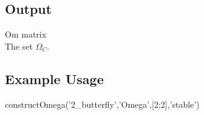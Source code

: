 \subsection*{Output}
\begin{param}
    \item[Om] matrix\\The set $\Omega_C$.
\end{param}

\subsection*{Example Usage}
\begin{param}
    \item[{constructOmega('2\_butterfly','Omega',[2;2],'stable')}]
\end{param}   

